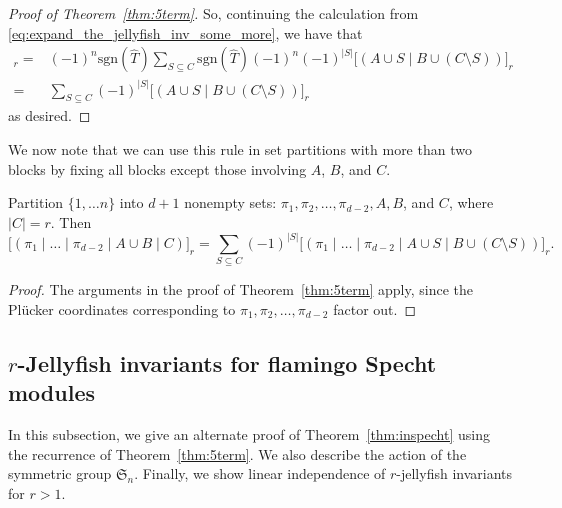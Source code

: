 \documentclass[ALCO, Unicode]{cedram}
\numberwithin{equation}{section}
\newcommand{\sgn}{\mathrm{sgn}}
\begin{document}
\begin{proof}[Proof of Theorem~\ref{thm:5term}]
So, continuing the calculation from \eqref{eq:expand_the_jellyfish_inv_some_more}, we have that 
\begin{align*}
   [(A\cup B \ | \ C)]_r =& (-1)^n\sgn(\widehat{T})\sum_{S\subseteq C}\sgn(\widehat{T})(-1)^n(-1)^{|S|}\big[( A\cup S \mid B\cup (C\setminus S) ) \big]_r \\
    =& \sum_{S\subseteq C}(-1)^{|S|}\big[( A\cup S \mid B\cup (C\setminus S) ) \big]_r
\end{align*}
as desired.
\end{proof}

We now note that we can use this rule in set partitions with more than two blocks by fixing all blocks except those involving $A$, $B$, and $C$.
\begin{corollary}\label{cor:twoblocks}
Partition $\{1,\ldots n\}$ into $d+1$ nonempty sets: $\pi_1,\pi_2,\ldots,\pi_{d-2}, A, B$, and $C$, where $|C|=r$. Then 
\begin{equation}
\label{eq:manyterm}
\big[(\pi_1 \mid \ldots \mid \pi_{d-2} \mid A\cup B \mid C)\big]_r=\sum_{S\subseteq C}(-1)^{|S|}\big[(\pi_1 \mid \ldots \mid \pi_{d-2} \mid A\cup S \mid B\cup (C\setminus S))\big]_r.
\end{equation}
\end{corollary}
\begin{proof}
The arguments in the proof of Theorem~\ref{thm:5term} apply, since the Pl\"ucker coordinates corresponding to $\pi_1,\pi_2,\ldots,\pi_{d-2}$ factor out.
\end{proof}


\subsection{\texorpdfstring{$r$}{r}-Jellyfish invariants for flamingo Specht modules}
\label{sec:rest}
In this subsection, we give an alternate proof of Theorem~\ref{thm:inspecht} using the recurrence of Theorem~\ref{thm:5term}. We also describe the action of the symmetric group $\mathfrak{S}_n$. Finally, we show linear independence of $r$-jellyfish invariants for $r>1$.
\end{document}
